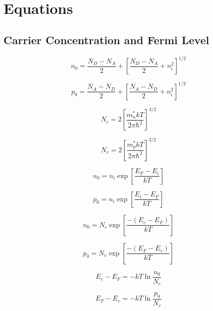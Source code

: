 \documentclass{infosheet}
\begin{document}
\section{Equations}

\subsection{Carrier Concentration and Fermi Level}

\begin{displaymath}
  n_0 = \frac{N_D-N_A}{2} + \left[\frac{N_D-N_A}{2}+n_i^2\right]^{1/2}
\end{displaymath}

\begin{displaymath}
  p_0 = \frac{N_A-N_D}{2} + \left[\frac{N_A-N_D}{2}+n_i^2\right]^{1/2}
\end{displaymath}

\begin{multicols}{2}
  \begin{displaymath}
    N_c = 2\left[\frac{m_n^*kT}{2\pi\hbar^2}\right]^{3/2}
  \end{displaymath}
  
  \begin{displaymath}
    N_v = 2\left[\frac{m_p^*kT}{2\pi\hbar^2}\right]^{3/2}
  \end{displaymath}
\end{multicols}

\begin{multicols}{2}
  \begin{displaymath}
    n_0 = n_i\exp\left[\frac{E_F-E_i}{kT}\right]
  \end{displaymath}
  
  \begin{displaymath}
    p_0 = n_i\exp\left[\frac{E_i-E_F}{kT}\right]
  \end{displaymath}
\end{multicols}

\begin{multicols}{2}
  \begin{displaymath}
    n_0 = N_c\exp\left[\frac{-(E_c-E_F)}{kT}\right]
  \end{displaymath}
  
  \begin{displaymath}
    p_0 = N_v\exp\left[\frac{-(E_F-E_v)}{kT}\right]
  \end{displaymath}
\end{multicols}

\begin{multicols}{2}
  \begin{displaymath}
    E_c-E_F = -kT\ln\frac{n_0}{N_c}
  \end{displaymath}
  
  \begin{displaymath}
    E_F-E_v = -kT\ln\frac{p_0}{N_v}
  \end{displaymath}
\end{multicols}
\end{document}
